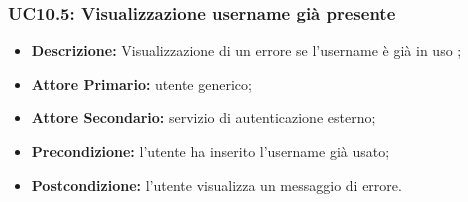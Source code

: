 \subsubsection{UC10.5: Visualizzazione username già presente}
\label{sec:UC10.5}
\begin{itemize}
    \item \textbf{Descrizione:} Visualizzazione di un errore se l'username è già in uso ;
    \item \textbf{Attore Primario:} utente generico;
    \item \textbf{Attore Secondario:} servizio di autenticazione esterno;
    \item \textbf{Precondizione:} l'utente ha inserito l'username già usato;
    \item \textbf{Postcondizione:} l'utente visualizza un messaggio di errore. 
\end{itemize}